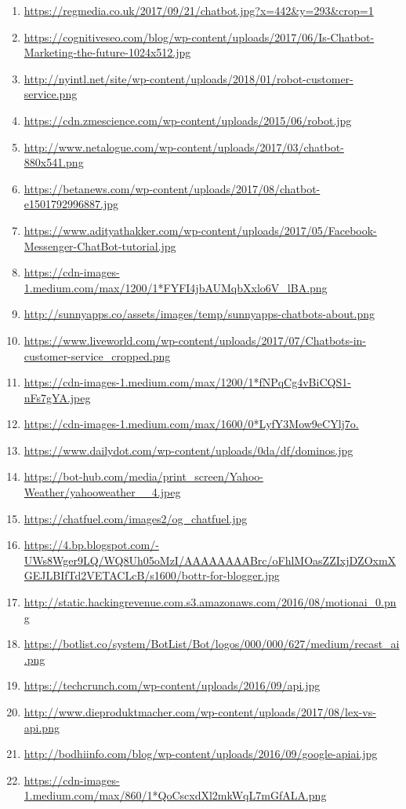 \documentclass[a4paper,12pt]{report}
\begin{document}
\begin{enumerate}[align=left, rightmargin=\dimexpr\linewidth-14cm-\leftmargin\relax]
\item \url{https://regmedia.co.uk/2017/09/21/chatbot.jpg?x=442&y=293&crop=1}
\item \url{https://cognitiveseo.com/blog/wp-content/uploads/2017/06/Is-Chatbot-Marketing-the-future-1024x512.jpg}
\item \url{http://nyintl.net/site/wp-content/uploads/2018/01/robot-customer-service.png}
\item \url{https://cdn.zmescience.com/wp-content/uploads/2015/06/robot.jpg}
\item \url{http://www.netalogue.com/wp-content/uploads/2017/03/chatbot-880x541.png}
\item \url{https://betanews.com/wp-content/uploads/2017/08/chatbot-e1501792996887.jpg}
\item \url{https://www.adityathakker.com/wp-content/uploads/2017/05/Facebook-Messenger-ChatBot-tutorial.jpg}
\item \url{https://cdn-images-1.medium.com/max/1200/1*FYFI4jbAUMqbXxlo6V_lBA.png}
\item \url{http://sunnyapps.co/assets/images/temp/sunnyapps-chatbots-about.png}
\item \url{https://www.liveworld.com/wp-content/uploads/2017/07/Chatbots-in-customer-service_cropped.png}
\item \url{https://cdn-images-1.medium.com/max/1200/1*fNPqCg4vBiCQS1-nFs7gYA.jpeg}
\item \url{https://cdn-images-1.medium.com/max/1600/0*LyfY3Mow9eCYlj7o.}
\item \url{https://www.dailydot.com/wp-content/uploads/0da/df/dominos.jpg}
\item \url{https://bot-hub.com/media/print_screen/Yahoo-Weather/yahooweather__4.jpeg}
\item \url{https://chatfuel.com/images2/og_chatfuel.jpg}
\item \url{https://4.bp.blogspot.com/-UWs8Wger9LQ/WQ8Uh05oMzI/AAAAAAAABrc/oFhlMOasZZIxjDZOxmXGEJLBIfTd2VETACLcB/s1600/bottr-for-blogger.jpg}
\item \url{http://static.hackingrevenue.com.s3.amazonaws.com/2016/08/motionai_0.png}
\item \url{https://botlist.co/system/BotList/Bot/logos/000/000/627/medium/recast_ai.png}
\item \url{https://techcrunch.com/wp-content/uploads/2016/09/api.jpg}
\item \url{http://www.dieproduktmacher.com/wp-content/uploads/2017/08/lex-vs-api.png}
\item \url{http://bodhiinfo.com/blog/wp-content/uploads/2016/09/google-apiai.jpg}
\item \url{https://cdn-images-1.medium.com/max/860/1*QoCscxdXl2mkWqL7mGfALA.png}
\end{enumerate}
\end{document}
